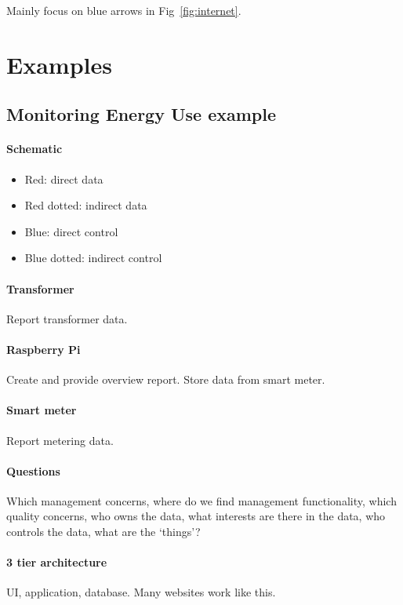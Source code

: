 \documentclass[11pt]{article}
\begin{document}
    Mainly focus on blue arrows in Fig~\ref{fig:internet}.

    \section{Examples}

    \subsection{Monitoring Energy Use example}

    \paragraph{Schematic}
    \begin{itemize}
        \item Red: direct data
        \item Red dotted: indirect data
        \item Blue: direct control
        \item Blue dotted: indirect control
    \end{itemize}

    \paragraph{Transformer}
    Report transformer data.
    \paragraph{Raspberry Pi}
    Create and provide overview report.
    Store data from smart meter.
    \paragraph{Smart meter}
    Report metering data.

    \paragraph{Questions}
    Which management concerns, where do we find management functionality, which quality concerns, who owns the data,
    what interests are there in the data, who controls the data, what are the `things'?

    \paragraph{3 tier architecture}
    UI, application, database.
    Many websites work like this.
\end{document}
